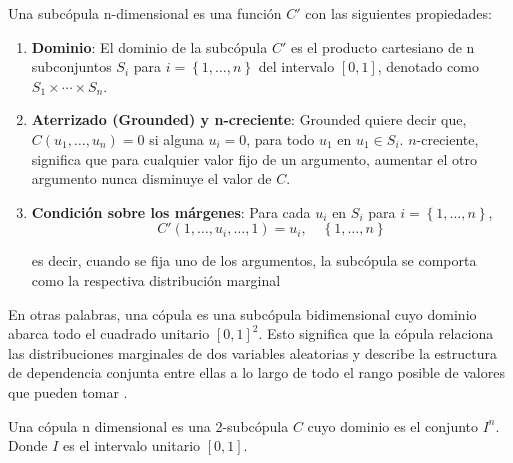 \begin{defn}
    Una subcópula n-dimensional es una función $C'$ con las siguientes propiedades:

    \begin{enumerate}
        \item \textbf{Dominio}: El dominio de la subcópula $C'$ es el producto cartesiano de n subconjuntos $S_i $ para $ i = \left\{ 1, \dots, n\right\}$ del intervalo $[0, 1]$, denotado como $S_1 \times \cdots \times S_n$.

        \item \textbf{Aterrizado (Grounded) y n-creciente}: Grounded quiere decir que, $C(u_1, \dots, u_n)=0$ si alguna $u_i = 0$, para todo $u_1$ en $u_1 \in S_i$. 
        $n$-creciente, significa que para cualquier valor fijo de un argumento, aumentar el otro argumento nunca disminuye el valor de $C$.

        \item \textbf{Condición sobre los márgenes}: Para cada $u_i$ en $S_i$ para $i =  \left\{ 1, \dots, n\right\}$, 
        \begin{equation}
            C'(1, \dots, u_i, \dots,  1) = u_i, \quad \left\{ 1, \dots, n\right\}
        \end{equation}

        es decir, cuando se fija uno de los argumentos, la subcópula se comporta como la respectiva distribución marginal
    \end{enumerate}
\end{defn}

En otras palabras, una cópula es una subcópula bidimensional cuyo dominio abarca todo el cuadrado unitario $[0, 1]^2$. Esto significa que la cópula relaciona las distribuciones marginales de dos variables aleatorias y describe la estructura de dependencia conjunta entre ellas a lo largo de todo el rango posible de valores que pueden tomar \cite{nelsenintroduction}.

\begin{defn}
    Una cópula n dimensional es una 2-subcópula $C$ cuyo dominio es el conjunto $I^n$. Donde $I$ es el intervalo unitario $[0,1]$. 
\end{defn}

